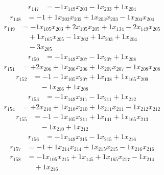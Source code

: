 \[\begin{aligned}
r_{147} &= - 1 x_{149} x_{203} - 1 x_{203} + 1 x_{204}
\end{aligned}\]
\[\begin{aligned}
r_{148} &= - 1 + 1 x_{202} x_{202} + 1 x_{203} x_{203} - 1 x_{204} x_{204}
\end{aligned}\]
\[\begin{aligned}
r_{149} &= - 1 x_{105} x_{203} + 2 x_{105} x_{205} + 1 x_{134} - 2 x_{149} x_{205} \\
 &\quad + 1 x_{165} x_{205} - 1 x_{202} + 1 x_{203} + 1 x_{204} \\
 &\quad - 3 x_{205}
\end{aligned}\]
\[\begin{aligned}
r_{150} &= - 1 x_{149} x_{207} - 1 x_{207} + 1 x_{208}
\end{aligned}\]
\[\begin{aligned}
r_{151} &= + 2 x_{206} + 1 x_{206} x_{206} + 1 x_{207} x_{207} - 1 x_{208} x_{208}
\end{aligned}\]
\[\begin{aligned}
r_{152} &= - 1 - 1 x_{105} x_{207} + 1 x_{138} + 1 x_{165} x_{209} \\
 &\quad - 1 x_{206} + 1 x_{208}
\end{aligned}\]
\[\begin{aligned}
r_{153} &= - 1 x_{149} x_{211} - 1 x_{211} + 1 x_{212}
\end{aligned}\]
\[\begin{aligned}
r_{154} &= + 2 x_{210} + 1 x_{210} x_{210} + 1 x_{211} x_{211} - 1 x_{212} x_{212}
\end{aligned}\]
\[\begin{aligned}
r_{155} &= - 1 - 1 x_{105} x_{211} + 1 x_{141} + 1 x_{165} x_{213} \\
 &\quad - 1 x_{210} + 1 x_{212}
\end{aligned}\]
\[\begin{aligned}
r_{156} &= - 1 x_{149} x_{215} - 1 x_{215} + 1 x_{216}
\end{aligned}\]
\[\begin{aligned}
r_{157} &= - 1 + 1 x_{214} x_{214} + 1 x_{215} x_{215} - 1 x_{216} x_{216}
\end{aligned}\]
\[\begin{aligned}
r_{158} &= - 1 x_{105} x_{215} + 1 x_{145} + 1 x_{165} x_{217} - 1 x_{214} \\
 &\quad + 1 x_{216}
\end{aligned}\]
